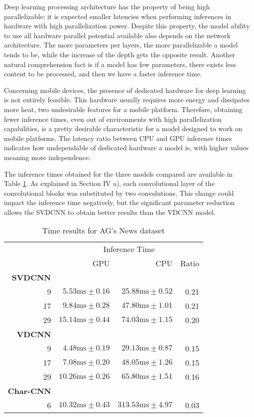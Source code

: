 \documentclass[conference]{IEEEtran}
\newcommand{\ra}[1]{\renewcommand{\arraystretch}{#1}}
\begin{document}
Deep learning processing architecture has the property of being high parallelizable; it is expected smaller latencies when performing inferences in hardware with high parallelization power. Despite this property, the model ability to use all hardware parallel potential available also depends on the network architecture. The more parameters per layers, the more parallelizable a model tends to be, while the increase of the depth gets the opposite result. Another natural comprehension fact is if a model has few parameters, there exists less content to be processed, and then we have a faster inference time. 

Concerning mobile devices, the presence of dedicated hardware for deep learning is not entirely feasible. This hardware usually requires more energy and dissipates more heat, two undesirable features for a mobile platform. Therefore, obtaining fewer inference times, even out of environments with high parallelization capabilities, is a pretty desirable characteristic for a model designed to work on mobile platforms. The latency ratio between CPU and GPU inference times indicates how undependable of dedicated hardware a model is, with higher values meaning more independence. 

The inference times obtained for the three models compared are available in Table \ref{time_results}. As explained in Section IV a), each convolutional layer of the convolutional blocks was substituted by two convolutions. This change could impact the inference time negatively, but the significant parameter reduction allows the SVDCNN to obtain better results than the VDCNN model.

\begin{table}[!b]
\caption{Time results for AG's News dataset}
\label{time_results}
\ra{1.3}
\begin{center}
\begin{tabular}{@{}rrrr@{}}\toprule
& \multicolumn{3}{c}{Inference Time} \\
\cmidrule{2-4}
& GPU & CPU & Ratio \\ \midrule
\textbf{SVDCNN}\\
9 & $5.53\text{ms}\pm0.16$ & $25.88\text{ms}\pm0.52$ & 0.21 \\
17 & $9.84\text{ms}\pm0.28$ & $47.80\text{ms}\pm1.01$ & 0.21 \\
29 & $15.14\text{ms}\pm0.44$ & $74.03\text{ms}\pm1.15$ & 0.20 \\
\textbf{VDCNN}\\
9 & $4.48\text{ms}\pm0.19$ & $29.13\text{ms}\pm0.87$ & 0.15 \\
17 & $7.08\text{ms}\pm0.20$ & $48.05\text{ms}\pm1.26$ & 0.15 \\
29 & $10.26\text{ms}\pm0.26$ & $65.80\text{ms}\pm1.51$ & 0.16 \\
\textbf{Char-CNN}\\
6 & $10.32\text{ms}\pm0.43$ & $313.53\text{ms}\pm4.97$ & 0.03 \\
\bottomrule
\end{tabular}
\end{center}
\end{table}
\end{document}
